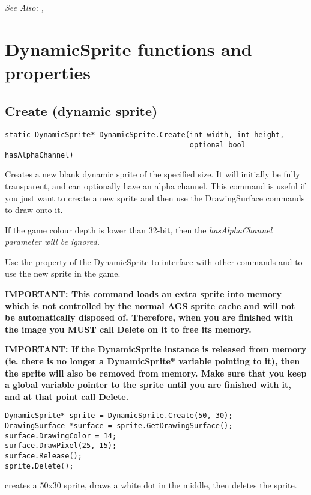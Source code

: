 \it{See Also:} ,



\section{DynamicSprite functions and properties}%



\subsection{Create (dynamic sprite)}\label{DynamicSprite.Create}%

\begin{verbatim}
static DynamicSprite* DynamicSprite.Create(int width, int height,
                                           optional bool hasAlphaChannel)
\end{verbatim}
Creates a new blank dynamic sprite of the specified size. It will initially be
fully transparent, and can optionally have an alpha channel. This command is
useful if you just want to create a new sprite and then use the DrawingSurface
commands to draw onto it.

If the game colour depth is lower than 32-bit, then the \it{hasAlphaChannel}
parameter will be ignored.

Use the  property of the DynamicSprite to
interface with other commands and to use the new sprite in the game.

\bf{IMPORTANT:} This command loads an extra sprite into memory which is not controlled
by the normal AGS sprite cache and will not be automatically disposed of. Therefore, when
you are finished with the image you \bf{MUST} call Delete on it to free its memory.

\bf{IMPORTANT:} If the DynamicSprite instance is released from memory (ie. there is
no longer a DynamicSprite* variable pointing to it), then the sprite will also be
removed from memory. Make sure that you keep a global variable pointer to the sprite
until you are finished with it, and at that point call Delete.

\begin{verbatim}
DynamicSprite* sprite = DynamicSprite.Create(50, 30);
DrawingSurface *surface = sprite.GetDrawingSurface();
surface.DrawingColor = 14;
surface.DrawPixel(25, 15);
surface.Release();
sprite.Delete();
\end{verbatim}
creates a 50x30 sprite, draws a white dot in the middle, then deletes the sprite.

